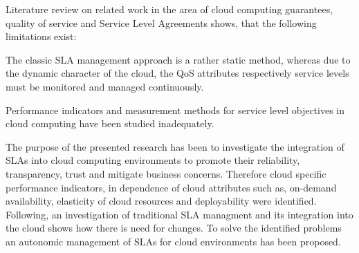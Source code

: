 Literature review on related work in the area of cloud computing guarantees, quality of service  and Service Level Agreements shows, that the following limitations exist:

The classic SLA management approach is a rather static method, whereas due to the dynamic character of the cloud, the QoS attributes respectively service levels must be monitored and managed continuously\cite{Ludwig03WSLA}.

Performance indicators\cite{5557978} and measurement methods for service level objectives in cloud computing have been studied inadequately\cite{Wieder2011}.

The purpose of the presented research has been to investigate the integration of SLAs into cloud computing environments to promote their reliability, transparency, trust and mitigate business concerns. Therefore cloud specific performance indicators, in dependence of cloud attributes such as, on-demand availability, elasticity of cloud resources and deployability were identified. Following, an investigation of traditional SLA managment and its integration into the cloud shows how there is need for changes. To solve the identified problems an autonomic management of SLAs for cloud environments has been proposed.



